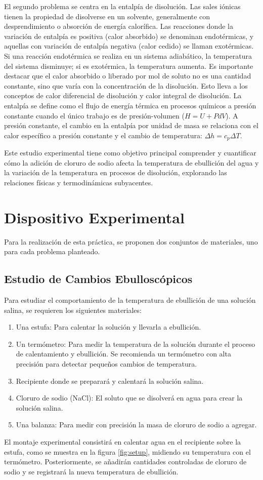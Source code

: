 \documentclass{article}
\begin{document}
El segundo problema se centra en la entalpía de disolución. Las sales iónicas tienen la propiedad de disolverse en un solvente, generalmente con desprendimiento o absorción de energía calorífica. Las reacciones donde la variación de entalpía es positiva (calor absorbido) se denominan endotérmicas, y aquellas con variación de entalpía negativa (calor cedido) se llaman exotérmicas. Si una reacción endotérmica se realiza en un sistema adiabático, la temperatura del sistema disminuye; si es exotérmica, la temperatura aumenta. Es importante destacar que el calor absorbido o liberado por mol de soluto no es una cantidad constante, sino que varía con la concentración de la disolución. Esto lleva a los conceptos de calor diferencial de disolución y calor integral de disolución. La entalpía se define como el flujo de energía térmica en procesos químicos a presión constante cuando el único trabajo es de presión-volumen ($H=U+PdV$). A presión constante, el cambio en la entalpía por unidad de masa se relaciona con el calor específico a presión constante y el cambio de temperatura: $\Delta h=c_{p}\Delta T$.

Este estudio experimental tiene como objetivo principal comprender y cuantificar cómo la adición de cloruro de sodio afecta la temperatura de ebullición del agua y la variación de la temperatura en procesos de disolución, explorando las relaciones físicas y termodinámicas subyacentes.

\section{Dispositivo Experimental}
Para la realización de esta práctica, se proponen dos conjuntos de materiales, uno para cada problema planteado.

\subsection{Estudio de Cambios Ebulloscópicos}
Para estudiar el comportamiento de la temperatura de ebullición de una solución salina, se requieren los siguientes materiales:
\begin{enumerate}
    \item Una estufa: Para calentar la solución y llevarla a ebullición.
    \item Un termómetro: Para medir la temperatura de la solución durante el proceso de calentamiento y ebullición. Se recomienda un termómetro con alta precisión para detectar pequeños cambios de temperatura.
    \item Recipiente donde se preparará y calentará la solución salina.
    \item Cloruro de sodio (NaCl): El soluto que se disolverá en agua para crear la solución salina.
    \item Una balanza: Para medir con precisión la masa de cloruro de sodio a agregar.
\end{enumerate}
El montaje experimental consistirá en calentar agua en el recipiente sobre la estufa, como se muestra en la figura \ref{fig:setup}, midiendo su temperatura con el termómetro. Posteriormente, se añadirán cantidades controladas de cloruro de sodio y se registrará la nueva temperatura de ebullición.
\end{document}
